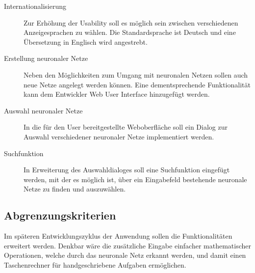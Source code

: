 \begin{description}
\item [Internationalisierung]
Zur Erhöhung der Usability soll es möglich sein zwischen verschiedenen Anzeigesprachen zu wählen. Die Standardsprache ist Deutsch und eine Übersetzung in Englisch wird angestrebt.
\item [Erstellung neuronaler Netze]
Neben den Möglichkeiten zum Umgang mit neuronalen Netzen sollen auch neue Netze angelegt werden können. Eine dementsprechende Funktionalität kann dem Entwickler Web User Interface hinzugefügt werden. 
\item [Auswahl neuronaler Netze] 
In die für den User bereitgestellte Weboberfläche soll ein Dialog zur Auswahl verschiedener neuronaler Netze implementiert werden.
\item [Suchfunktion]
In Erweiterung des Auswahldialoges soll eine Suchfunktion eingefügt werden, mit der es möglich ist, über ein Eingabefeld bestehende neuronale Netze zu finden und auszuwählen.
\end{description}

 
\subsection{Abgrenzungskriterien}
Im späteren Entwicklungszyklus der Anwendung sollen die Funktionalitäten erweitert werden. Denkbar wäre die zusätzliche Eingabe einfacher mathematischer Operationen, welche durch das neuronale Netz erkannt werden, und damit einen Taschenrechner für handgeschriebene Aufgaben ermöglichen.
